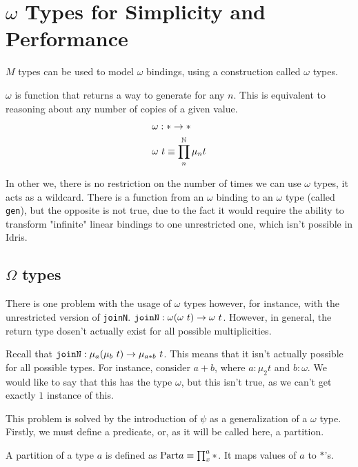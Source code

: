 \section{$\omega$ Types for Simplicity and Performance}

$M$ types can be used to model $\omega$ bindings, using a construction called $\omega$ types.
%

\begin{definition}
	$\omega$ is function that returns a way to generate \tmu for any $n$.
	This is equivalent to reasoning about any number of copies of a given value.
	\begin{align}
		&\omega : \ast \to \ast \\
		&\omega \ t \equiv \prod_{n}^{\mathbb{N}} \mu_n t
	\end{align}
\end{definition}

In other we, there is no restriction on the number of times we can use $\omega$ types, it acts as a wildcard.
There is a function from an $\omega$ binding to an $\omega$ type (called \verb|gen|), but the opposite is not true, due to the fact it would require the ability to transform "infinite" linear bindings to one unrestricted one, which isn't possible in Idris.

\subsection{$\Omega$ types}

There is one problem with the usage of $\omega$ types however, for instance, with the unrestricted version of \verb|joinN|.
$\verb|joinN| : \omega (\omega \ t) \to \omega \ t$.
However, in general, the return type dosen't actually exist for all possible multiplicities.

Recall that $\verb|joinN| : \mu_a (\mu_b \ t) \to \mu_{a * b} \ t$. 
This means that it isn't actually possible for all possible types. 
For instance, consider $a + b$, where $a : \mu_2 t$ and $b : \omega$. 
We would like to say that this has the type $\omega$, but this isn't true, as we can't get exactly $1$ instance of this.

This problem is solved by the introduction of $\psi$ as a generalization of a $\omega$ type.
Firstly, we must define a predicate, or, as it will be called here, a partition.

\begin{definition}
	A partition of a type $a$ is defined as $\text{Part} a \equiv \prod_x^a \ast$.
	It maps values of $a$ to $\ast$'s.
\end{definition}

